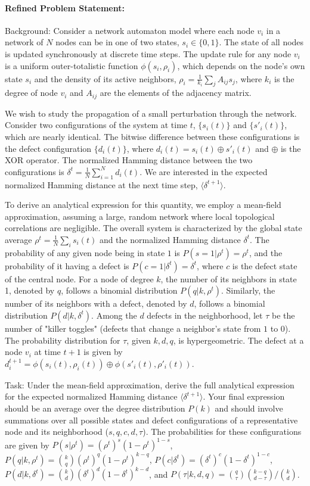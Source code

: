 \documentclass[10pt]{article}
\begin{document}
\paragraph*{Refined Problem Statement:}
Background:
Consider a network automaton model where each node $v_i$ in a network of $N$ nodes can be in one of two states, $s_i \in \{0,1\}$. The state of all nodes is updated synchronously at discrete time steps. The update rule for any node $v_i$ is a uniform outer-totalistic function $\phi(s_i, \rho_i)$, which depends on the node's own state $s_i$ and the density of its active neighbors, $\rho_i = \frac{1}{k_i}\sum_{j}A_{ij}s_j$, where $k_i$ is the degree of node $v_i$ and $A_{ij}$ are the elements of the adjacency matrix.

We wish to study the propagation of a small perturbation through the network. Consider two configurations of the system at time $t$, $\{s_i(t)\}$ and $\{s'_i(t)\}$, which are nearly identical. The bitwise difference between these configurations is the defect configuration $\{d_i(t)\}$, where $d_i(t) = s_i(t) \oplus s'_i(t)$ and $\oplus$ is the XOR operator. The normalized Hamming distance between the two configurations is $\delta^t = \frac{1}{N}\sum_{i=1}^N d_i(t)$. We are interested in the expected normalized Hamming distance at the next time step, $\langle\delta^{t+1}\rangle$.

To derive an analytical expression for this quantity, we employ a mean-field approximation, assuming a large, random network where local topological correlations are negligible. The overall system is characterized by the global state average $\rho^t = \frac{1}{N}\sum_i s_i(t)$ and the normalized Hamming distance $\delta^t$. The probability of any given node being in state $1$ is $P(s=1|\rho^t) = \rho^t$, and the probability of it having a defect is $P(c=1|\delta^t) = \delta^t$, where $c$ is the defect state of the central node. For a node of degree $k$, the number of its neighbors in state 1, denoted by $q$, follows a binomial distribution $P(q|k, \rho^t)$. Similarly, the number of its neighbors with a defect, denoted by $d$, follows a binomial distribution $P(d|k, \delta^t)$. Among the $d$ defects in the neighborhood, let $\tau$ be the number of "killer toggles" (defects that change a neighbor's state from $1$ to $0$). The probability distribution for $\tau$, given $k, d, q$, is hypergeometric. The defect at a node $v_i$ at time $t+1$ is given by $d_i^{t+1} = \phi(s_i(t), \rho_i(t)) \oplus \phi(s'_i(t), \rho'_i(t))$.

Task:
Under the mean-field approximation, derive the full analytical expression for the expected normalized Hamming distance $\langle\delta^{t+1}\rangle$. Your final expression should be an average over the degree distribution $P(k)$ and should involve summations over all possible states and defect configurations of a representative node and its neighborhood ($s, q, c, d, \tau$). The probabilities for these configurations are given by $P(s|\rho^t) = (\rho^t)^s (1-\rho^t)^{1-s}$, $P(q|k,\rho^t) = \binom{k}{q}(\rho^t)^q (1-\rho^t)^{k-q}$, $P(c|\delta^t) = (\delta^t)^c (1-\delta^t)^{1-c}$, $P(d|k, \delta^t) = \binom{k}{d}(\delta^t)^d (1-\delta^t)^{k-d}$, and $P(\tau|k, d, q) = \binom{q}{\tau}\binom{k-q}{d-\tau} / \binom{k}{d}$.
\end{document}
